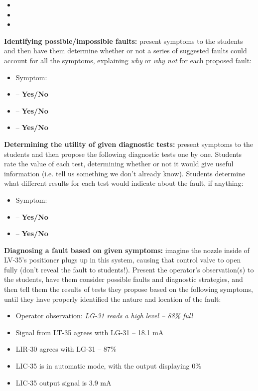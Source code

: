\begin{itemize}
\item{} 
\item{} 
\item{} 
\end{itemize}


\vskip 10pt


\noindent
{\bf Identifying possible/impossible faults:} present symptoms to the students and then have them determine whether or not a series of suggested faults could account for all the symptoms, explaining {\it why} or {\it why not} for each proposed fault:

\begin{itemize}
\item{} Symptom: {\it }
\item{}  -- {\bf Yes/No}
\item{}  -- {\bf Yes/No}
\item{}  -- {\bf Yes/No}
\end{itemize}


\vskip 10pt


\noindent
{\bf Determining the utility of given diagnostic tests:} present symptoms to the students and then propose the following diagnostic tests one by one.  Students rate the value of each test, determining whether or not it would give useful information (i.e. tell us something we don't already know).  Students determine what different results for each test would indicate about the fault, if anything:

\begin{itemize}
\item{} Symptom: {\it }
\item{}  -- {\bf Yes/No}
\item{}  -- {\bf Yes/No}
\end{itemize}


\vskip 10pt


\noindent
{\bf Diagnosing a fault based on given symptoms:} imagine the nozzle inside of LV-35's positioner plugs up in this system, causing that control valve to open fully (don't reveal the fault to students!).  Present the operator's observation(s) to the students, have them consider possible faults and diagnostic strategies, and then tell them the results of tests they propose based on the following symptoms, until they have properly identified the nature and location of the fault:

\begin{itemize}
\item{} Operator observation: {\it LG-31 reads a high level -- 88\% full}
\item{} Signal from LT-35 agrees with LG-31 -- 18.1 mA
\item{} LIR-30 agrees with LG-31 -- 87\%
\item{} LIC-35 is in automatic mode, with the output displaying 0\%
\item{} LIC-35 output signal is 3.9 mA
\end{itemize}



